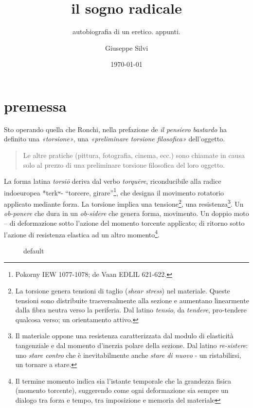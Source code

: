 \documentclass{gs}
\title{il sogno radicale}
\subtitle{autobiografia di un eretico. appunti.}
\author{Giuseppe Silvi}
\date{\today}
\begin{document}
\maketitle

\section*{premessa}

Sto operando quella che Ronchi, nella prefazione de \emph{il pensiero bastardo} \cite{ronchi2001} ha definito una \emph{«torsione»}, una \emph{«preliminare torsione filosofica»} dell'oggetto.

\begin{quote}
  Le altre pratiche (pittura, fotografia, cinema, ecc.) sono chiamate in causa solo al prezzo di una preliminare torsione filosofica del loro oggetto. \cite{ronchi2001}
\end{quote}

La forma latina \textit{torsiō} deriva dal verbo \textit{torquēre}, riconducibile alla radice indoeuropea *terkʷ- “torcere, girare”\footnote{Pokorny IEW 1077-1078; de Vaan EDLIL 621-622.}, che designa il movimento rotatorio applicato mediante forza. La torsione implica una tensione\footnote{La torsione genera tensioni di taglio (\emph{shear stress}) nel materiale. Queste tensioni sono distribuite trasversalmente alla sezione e aumentano linearmente dalla fibra neutra verso la periferia. Dal latino \emph{tensio}, da \emph{tendere}, pro-tendere qualcosa verso; un orientamento attivo.}, una resistenza\footnote{Il materiale oppone una resistenza caratterizzata dal modulo di elasticità tangenziale e dal momento d'inerzia polare della sezione. Dal latino \emph{re-sistere}: uno \emph{stare contro} che è inevitabilmente anche \emph{stare di nuovo} - un ristabilirsi, un tornare a stare.}. Un \emph{ob-ponere} che dura in un \emph{ob-sidere} che genera forma, movimento. Un doppio moto – di deformazione sotto l'azione del momento torcente applicato; di ritorno sotto l'azione di resistenza elastica ad un altro momento\footnote{Il termine momento indica sia l'istante temporale che la grandezza fisica (momento torcente), suggerendo come ogni deformazione sia sempre un dialogo tra forza e tempo, tra imposizione e memoria del materiale}.

\begin{figure}[htbp]
\begin{center}
\caption{default}
\label{default}
\end{center}
\end{figure}
\end{document}
